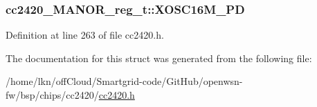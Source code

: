 \subsubsection[{\texorpdfstring{X\+O\+S\+C16\+M\+\_\+\+PD}{XOSC16M_PD}}]{ cc2420\+\_\+\+M\+A\+N\+O\+R\+\_\+reg\+\_\+t\+::\+X\+O\+S\+C16\+M\+\_\+\+PD}\hypertarget{structcc2420___m_a_n_o_r__reg__t_a65b9c3b2a1362215e9d3045ed74dcd1d}{}\label{structcc2420___m_a_n_o_r__reg__t_a65b9c3b2a1362215e9d3045ed74dcd1d}


Definition at line 263 of file cc2420.\+h.



The documentation for this struct was generated from the following file\+:\begin{DoxyCompactItemize}
\item 
/home/lkn/off\+Cloud/\+Smartgrid-\/code/\+Git\+Hub/openwsn-\/fw/bsp/chips/cc2420/\hyperlink{cc2420_8h}{cc2420.\+h}\end{DoxyCompactItemize}
